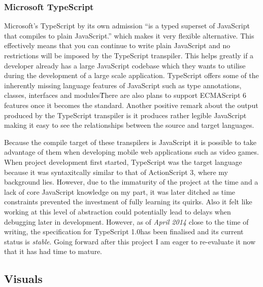 \documentclass[final]{cmpreport}
\begin{document}
\subsubsection{Microsoft TypeScript}
Microsoft's TypeScript by its own admission ``is a typed superset of JavaScript that compiles to plain JavaScript.'' which makes it very flexible alternative. This effectively means that you can continue to write plain JavaScript and no restrictions will be imposed by the TypeScript transpiler. This helps greatly if a developer already has a large JavaScript codebase which they wants to utilise during the development of a large scale application. TypeScript offers some of the inherently missing language features of JavaScript such as type annotations, classes, interfaces and modules\. There are also plans to support ECMAScript 6 features once it becomes the standard. Another positive remark about the output produced by the TypeScript transpiler is it produces rather legible JavaScript making it easy to see the relationships between the source and target languages.

Because the compile target of these transpilers is JavaScript it is possible to take advantage of them when developing mobile web applications such as video games. When project development first started, TypeScript was the target language because it was syntaxitcally similar to that of ActionScript 3, where my background lies. However, due to the immaturity of the project at the time and a lack of core JavaScript knowledge on my part, it was later ditched as time constraints prevented the investment of fully learning its quirks. Also it felt like working at this level of abstraction could potentially lead to delays when debugging later in development. However, as of \textit{April 2014} close to the time of writing, the specification for TypeScript 1.0\footnotemark has been finalised and its current status is \textit{stable}. Going forward after this project I am eager to re-evaluate it now that it has had time to mature.


\subsection{Visuals}
\end{document}
